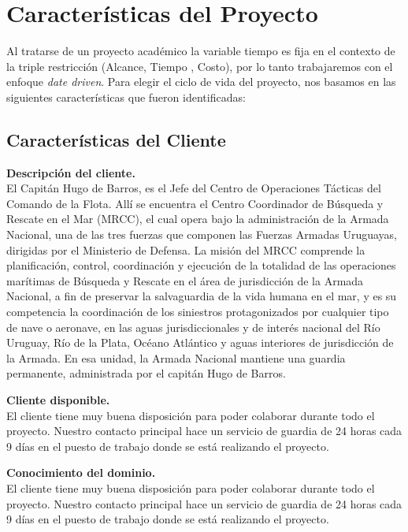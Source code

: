 \section{Características del Proyecto}\label{sec:caracteristicasDelProyecto}

Al tratarse de un proyecto académico la variable tiempo es fija en el contexto de la triple restricción (Alcance, Tiempo , Costo), 
por lo tanto trabajaremos con el enfoque \textit{date driven}. Para elegir el ciclo de vida del proyecto, nos basamos en las siguientes características 
que fueron identificadas:

\subsection{Características del Cliente} 
\textbf{Descripción del cliente.}\\
El Capitán Hugo de Barros, es el Jefe del Centro de Operaciones Tácticas del Comando de la Flota. 
Allí se encuentra el Centro Coordinador de Búsqueda y Rescate en el Mar (MRCC), el cual opera bajo la administración de la Armada Nacional, 
una de las tres fuerzas que componen las Fuerzas Armadas Uruguayas, dirigidas por el Ministerio de Defensa. 
La misión del MRCC comprende la planificación, control, coordinación y ejecución de la totalidad de las operaciones marítimas de Búsqueda y 
Rescate en el área de jurisdicción de la Armada Nacional, a fin de preservar la salvaguardia de la vida humana en el mar, y es su competencia 
la coordinación de los siniestros protagonizados por cualquier tipo de nave o aeronave, en las aguas jurisdiccionales y de interés nacional del 
Río Uruguay, Río de la Plata, Océano Atlántico y aguas interiores de jurisdicción de la Armada.
En esa unidad, la Armada Nacional mantiene una guardia permanente, administrada por el capitán Hugo de Barros. 

\textbf{Cliente disponible.}\\
El cliente tiene muy buena disposición para poder colaborar durante todo el proyecto. Nuestro contacto principal hace un 
servicio de guardia de 24 horas cada 9 días en el puesto de trabajo donde se está realizando el proyecto.

\textbf{Conocimiento del dominio.}\\
El cliente tiene muy buena disposición para poder colaborar durante todo el proyecto. Nuestro contacto principal hace un 
servicio de guardia de 24 horas cada 9 días en el puesto de trabajo donde se está realizando el proyecto.



